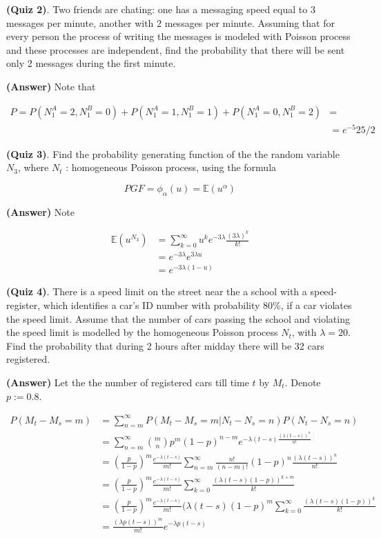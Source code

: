 \documentclass[12pt]{article}
\theoremstyle{nonumberbreak}
\begin{document}
\textbf{(Quiz 2)}. Two friends are chating: one has a messaging speed equal to $3$ messages per minute, another with $2$ messages per minute. Assuming that for every person the process of writing the messages is modeled with Poisson process and these processes are independent, find the probability that there will be sent only 2 messages during the first minute.

\textbf{(Answer)} Note that

$$
\begin{aligned}
P = P(N_1^A = 2, N_1^B = 0) + P(N_1^A = 1, N_1^B = 1) + P(N_1^A = 0, N_1^B = 2) &= \\[8pt]
&= e^{-5} 25/2
\end{aligned}
$$



\textbf{(Quiz 3)}. Find the probability generating function of the the random variable $N_3$, where $N_t$ : homogeneous Poisson process, using the formula 

$$
PGF = \phi_\alpha (u) = \mathbb{E}(u^\alpha)
$$

\textbf{(Answer)} Note

$$
\begin{aligned}
\mathbb{E}(u^{N_3}) &= \sum_{k=0}^\infty u^k e^{-3\lambda} \frac{(3\lambda)^k}{k!} \\[8pt]
&= e^{-3\lambda} e^{3\lambda u} \\[8pt]
&= e^{-3\lambda(1-u)}
\end{aligned}
$$



\textbf{(Quiz 4)}. There is a speed limit on the street near the a school with a speed-register, which identifies a car's ID number with probability 80\%, if a car violates the speed limit. Assume that the number of cars passing the school and violating the speed limit is modelled by the homogeneous Poisson process $N_t$, with $\lambda=20$. Find the probability that during 2 hours after midday there will be 32 cars registered.


\textbf{(Answer)} Let the the number of registered cars till time $t$ by $M_t$. Denote $p := 0.8$. 

$$
\begin{aligned}
P(M_t - M_s = m) &= \sum_{n=m}^\infty P(M_t - M_s = m | N_t - N_s = n ) P (N_t - N_s = n)\\[8pt]
&= \sum_{n=m}^\infty \binom{m}{n} p^m (1-p)^{n-m} e^{-\lambda(t-s) \frac{(\lambda(t-s))^n}{n!}} \\[8pt]
&= (\frac{p}{1-p})^m \frac{e^{-\lambda (t-s)}}{m!}\sum_{n=m}^\infty \frac{n!}{(n-m)!} (1-p)^n \frac{(\lambda(t-s))^n}{n!} \\[8pt]
&= (\frac{p}{1-p})^m \frac{e^{-\lambda (t-s)}}{m!} \sum_{k=0}^\infty \frac{(\lambda (t-s) (1-p) )^{k+m}}{k!} \\[8pt]
&= (\frac{p}{1-p})^m \frac{e^{-\lambda (t-s)}}{m!} (\lambda (t-s) (1-p)^m \sum_{k=0}^\infty \frac{(\lambda (t-s) (1-p) )^k}{k!} \\[8pt]
&= \frac{(\lambda p (t-s))^m}{m!} e^{-\lambda p (t-s)}
\end{aligned}
$$
\end{document}
